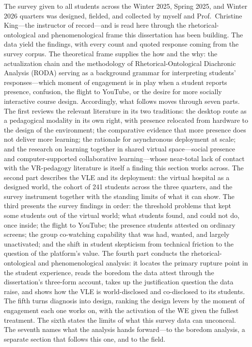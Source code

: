 The survey given to all students across the Winter 2025, Spring 2025, and
Winter 2026 quarters was designed, fielded, and collected by myself and
Prof.\ Christine King---the instructor of record---and is read here
through the rhetorical-ontological and phenomenological frame this dissertation
has been building. The data yield the findings, with every count and quoted
response coming from the survey corpus. The theoretical frame supplies the how
and the why: the actualization chain and the methodology of
Rhetorical-Ontological Diachronic Analysis (RODA) serving as a background
grammar for interpreting students' responses---which moment of engagement is in play when a
student reports presence, confusion, the flight to YouTube, or the desire for
more socially interactive course design. Accordingly, what follows moves through
seven parts. The first reviews the relevant literature in its two traditions:
the desktop route as a pedagogical modality in its own right, with presence
relocated from hardware to the design of the environment; the comparative
evidence that more presence does not deliver more learning; the rationale for
asynchronous deployment at scale; and the research on learning together in
shared virtual space---social presence and computer-supported collaborative
learning---whose near-total lack of contact with the VR-pedagogy literature is
itself a finding this section works across. The second part describes the VLE
and its deployment: the virtual hospital as a designed world, the cohort of 241
students across the three quarters, and the survey instrument together with the
standing limits of what it can show. The third presents the survey findings in
order: the threshold problems that kept some students out of the virtual world;
what students found, and could not do, once inside; the flight to YouTube; the
presence students attested on ordinary screens; the group co-watching capability
that was had, wanted, and largely unactivated; and the shift in student
skepticism from technical friction to the question of the platform's value. The
fourth part conducts the rhetorical-ontological and phenomenological analysis:
it locates the primary rupture point in the student experience, reads the
boredom the data attest through the dissertation's three-form account, takes
up the justification question the data raise, and shows how the VLE is
world-disclosed and co-disclosed to its students. The fifth turns diagnosis into design, ranking
the design levers by the moment of engagement each one works on, with the
activation of the WE given the fullest treatment. The sixth states the limits of
what this survey data can unconceal. The seventh names what the analysis hands
forward---to the boredom analysis, a separate section that follows this one, and
to the field.

